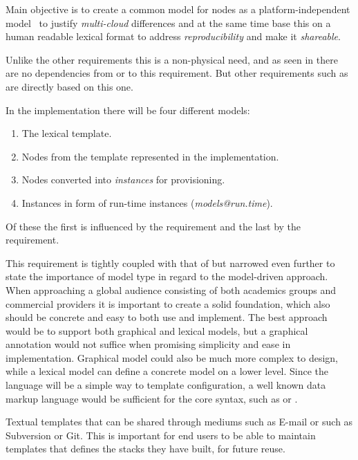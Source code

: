 Main objective is to create a common model for nodes as a platform-independent 
model~\cite{agile:cuong10} to justify \emph{multi-cloud} differences and 
at the same time base this on a human readable lexical format to address \emph{reproducibility} and
make it \emph{shareable}.

Unlike the other requirements this is a non-physical need, 
and as seen in 
there are no dependencies from or to this requirement.
But other requirements such as  are directly based on this one.

In the implementation there will be four different models:
\begin{enumerate}
  \item The lexical template.
  \item Nodes from the template represented in the implementation.
  \item Nodes converted into \emph{instances} for provisioning.
  \item Instances in form of run-time instances (\emph{models@run.time}).
\end{enumerate}
Of these the first is influenced by the  requirement and
the last by the  requirement.

This requirement is tightly coupled with that of  but narrowed 
even further to state the importance of model type in regard to the model-driven approach.
When approaching a global audience consisting of both academics groups and commercial
providers it is important to create a solid foundation, 
which also should be concrete and easy to both use and implement.
The best approach would be to support both graphical and lexical models, 
but a graphical annotation would not suffice when promising simplicity and ease in implementation. 
Graphical model could also be much more complex to design, 
while a lexical model can define a concrete model on a lower level.
Since the language will be a simple way to template configuration, 
a well known data markup language would be sufficient for the core syntax, such as 
 or .

Textual templates that can be shared through mediums such as E-mail or 
 such as Subversion or Git.
This is important for end users to be able to maintain templates that defines the stacks they have built, 
for future reuse.

